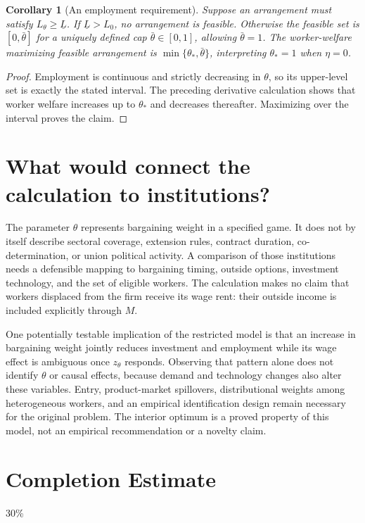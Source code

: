 \documentclass[11pt,a4paper]{article}
\newtheorem{corollary}[theorem]{Corollary}
\theoremstyle{remark}
\begin{document}
\begin{corollary}[An employment requirement]
Suppose an arrangement must satisfy $L_\theta\ge\underline L$. If $\underline L>L_0$, no arrangement is feasible. Otherwise the feasible set is $[0,\bar\theta]$ for a uniquely defined cap $\bar\theta\in[0,1]$, allowing $\bar\theta=1$. The worker-welfare maximizing feasible arrangement is $\min\{\theta_*,\bar\theta\}$, interpreting $\theta_*=1$ when $\eta=0$.
\end{corollary}
\begin{proof}
Employment is continuous and strictly decreasing in $\theta$, so its upper-level set is exactly the stated interval. The preceding derivative calculation shows that worker welfare increases up to $\theta_*$ and decreases thereafter. Maximizing over the interval proves the claim.
\end{proof}

\section{What would connect the calculation to institutions?}
The parameter $\theta$ represents bargaining weight in a specified game. It does not by itself describe sectoral coverage, extension rules, contract duration, co-determination, or union political activity. A comparison of those institutions needs a defensible mapping to bargaining timing, outside options, investment technology, and the set of eligible workers. The calculation makes no claim that workers displaced from the firm receive its wage rent: their outside income is included explicitly through $M$.

One potentially testable implication of the restricted model is that an increase in bargaining weight jointly reduces investment and employment while its wage effect is ambiguous once $z_\theta$ responds. Observing that pattern alone does not identify $\theta$ or causal effects, because demand and technology changes also alter these variables. Entry, product-market spillovers, distributional weights among heterogeneous workers, and an empirical identification design remain necessary for the original problem. The interior optimum is a proved property of this model, not an empirical recommendation or a novelty claim.

\section{Completion Estimate}
30\%
\end{document}

